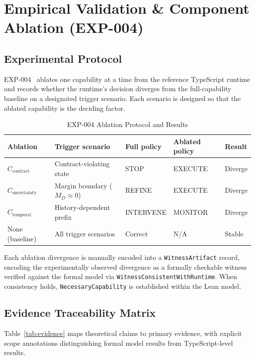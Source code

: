 \section{Empirical Validation \& Component Ablation (EXP-004)}

\subsection{Experimental Protocol}

EXP-004~\cite{takt_st016_2026} ablates one capability at a time from the reference
TypeScript runtime and records whether the runtime's decision diverges from the
full-capability baseline on a designated trigger scenario. Each scenario is
designed so that the ablated capability is the deciding factor.

\begin{table}[htbp]
\caption{EXP-004 Ablation Protocol and Results}
\label{tab:exp004}
\centering\small
\begin{tabular}{p{2.2cm}p{2.6cm}p{1.5cm}p{1.5cm}p{1.2cm}}
\toprule
\textbf{Ablation} & \textbf{Trigger scenario} & \textbf{Full policy} & \textbf{Ablated policy} & \textbf{Result} \\
\midrule
$C_{\text{contract}}$    & Contract-violating state    & STOP      & EXECUTE  & Diverge \\
$C_{\text{uncertainty}}$ & Margin boundary ($M_D\!\approx\!0$) & REFINE & EXECUTE & Diverge \\
$C_{\text{temporal}}$    & History-dependent prefix    & INTERVENE & MONITOR  & Diverge \\
\midrule
None (baseline)          & All trigger scenarios        & Correct   & N/A      & Stable  \\
\bottomrule
\end{tabular}
\end{table}

Each ablation divergence is manually encoded into a \texttt{WitnessArtifact}
record, encoding the experimentally observed divergence as a formally checkable
witness verified against the formal model via \texttt{WitnessConsistentWithRuntime}.
When consistency holds, \texttt{NecessaryCapability} is established within the Lean model.

\subsection{Evidence Traceability Matrix}

Table~\ref{tab:evidence} maps theoretical claims to primary evidence, with explicit
scope annotations distinguishing formal model results from TypeScript-level results.

